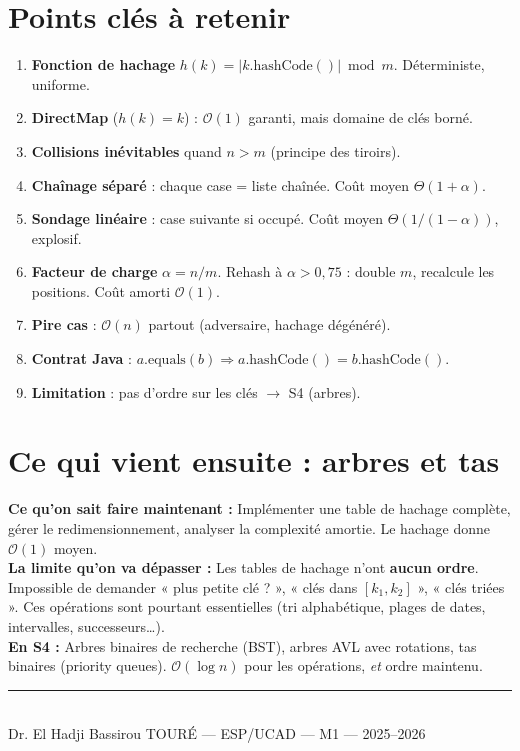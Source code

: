 \documentclass[11pt,a4paper]{article}
\newcommand{\bigO}{\mathcal{O}}
\begin{document}
\section{Points clés à retenir}

\begin{retenirbox}[Synthèse S03]
\begin{enumerate}
    \item \textbf{Fonction de hachage} $h(k) = |k.\text{hashCode}()| \bmod m$. Déterministe, uniforme.
    \item \textbf{DirectMap} ($h(k) = k$) : $\bigO(1)$ garanti, mais domaine de clés borné.
    \item \textbf{Collisions inévitables} quand $n > m$ (principe des tiroirs).
    \item \textbf{Chaînage séparé} : chaque case = liste chaînée. Coût moyen $\Theta(1 + \alpha)$.
    \item \textbf{Sondage linéaire} : case suivante si occupé. Coût moyen $\Theta(1/(1-\alpha))$, explosif.
    \item \textbf{Facteur de charge} $\alpha = n/m$. Rehash à $\alpha > 0{,}75$ : double $m$, recalcule les positions. Coût amorti $\bigO(1)$.
    \item \textbf{Pire cas} : $\bigO(n)$ partout (adversaire, hachage dégénéré).
    \item \textbf{Contrat Java} : $a.\text{equals}(b) \Rightarrow a.\text{hashCode}() = b.\text{hashCode}()$.
    \item \textbf{Limitation} : pas d'ordre sur les clés $\to$ S4 (arbres).
\end{enumerate}
\end{retenirbox}

\section*{Ce qui vient ensuite : arbres et tas}

\begin{prereqbox}
\textbf{Ce qu'on sait faire maintenant :} Implémenter une table de hachage complète, gérer le redimensionnement, analyser la complexité amortie. Le hachage donne $\bigO(1)$ moyen.\\[4pt]
\textbf{La limite qu'on va dépasser :} Les tables de hachage n'ont \textbf{aucun ordre}. Impossible de demander « plus petite clé ? », « clés dans $[k_1, k_2]$ », « clés triées ». Ces opérations sont pourtant essentielles (tri alphabétique, plages de dates, intervalles, successeurs\ldots).\\[4pt]
\textbf{En S4 :} Arbres binaires de recherche (BST), arbres AVL avec rotations, tas binaires (priority queues). $\bigO(\log n)$ pour les opérations, \emph{et} ordre maintenu.
\end{prereqbox}

\vfill
\begin{center}
\rule{0.6\textwidth}{0.4pt}\\[6pt]
{\small Dr. El Hadji Bassirou TOURÉ --- ESP/UCAD --- M1 --- 2025--2026}
\end{center}
\end{document}
